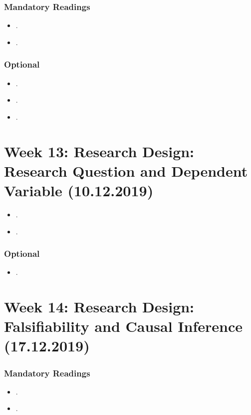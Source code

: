 \documentclass[abstract=on,parskip=full,headings=standardclasses,fontsize=11pt,paper=a4]{scrartcl}
\begin{document}
\subsubsection*{Mandatory Readings}
\begin{itemize}
\item {}.
\item {}.
\end{itemize}


\subsubsection*{Optional}
\begin{itemize}
\item {}.
\item {}.
\item {}.
\end{itemize}


\section{Week 13:  Research Design: Research Question and Dependent Variable  (10.12.2019)}

\begin{itemize}
\renewcommand\labelitemi{--}
\item {}.
\item {}.
\end{itemize}

\subsubsection*{Optional}
\begin{itemize}
\item {}.
\end{itemize}

\section{Week 14: Research Design: Falsifiability and Causal Inference (17.12.2019)}


\subsubsection*{Mandatory Readings}
\begin{itemize}
\item {}.
\item {}.
\end{itemize}
\end{document}
